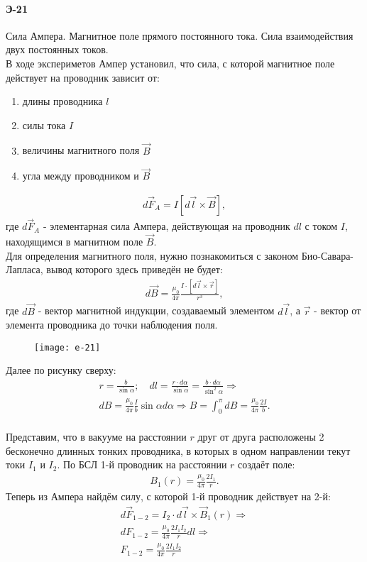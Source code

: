 \documentclass[__main__.tex]{subfiles}
\begin{document}
\paragraph{Э-21}
Сила Ампера. Магнитное поле прямого постоянного тока. Сила взаимодействия двух постоянных токов.\\

В ходе экспериметов Ампер установил, что сила, с которой магнитное поле действует на проводник зависит от: 
\begin{enumerate}
	\item длины проводника $l$
	\item силы тока $I$
	\item величины магнитного поля $\vec B$
	\item угла между проводником и $\vec B$
\end{enumerate}
\begin{gather*}
	d\vec F_A = I \left[ d\vec l\times\vec B\right],
\end{gather*}
где $d\vec F_A$ - элементарная сила Ампера, действующая на проводник $dl$ с током $I$, находящимся в магнитном поле $\vec B$.
\\
Для определения магнитного поля, нужно познакомиться с законом Био-Савара-Лапласа, вывод которого здесь приведён не будет:
\begin{gather*}
	d\vec B = \frac{\mu_0}{4\pi}\frac{I\cdot\left[d\vec l\times\vec r\right]}{r^3},
\end{gather*}
где $d\vec B$ - вектор магнитной индукции, создаваемый элементом $d\vec l$, а $\vec r$ - вектор от элемента проводника до точки наблюдения поля.
\begin{figure}[h]
	\centering
	\texttt{[image: e-21]}
\end{figure}
Далее по рисунку сверху:
\begin{gather*}
	r = \frac{b}{\sin\alpha};\quad
	dl = \frac{r\cdot d\alpha}{\sin\alpha} = \frac{b\cdot d\alpha}{\sin^2\alpha}\Rightarrow\\
	dB = \frac{\mu_0}{4\pi}\frac{I}{b}\sin\alpha d\alpha\Rightarrow B = \int_{0}^{\pi}dB = \frac{\mu_0}{4\pi}\frac{2I}{b}.
\end{gather*}
\\
Представим, что в вакууме на расстоянии $r$ друг от друга расположены 2 бесконечно длинных тонких проводника, в которых в одном направлении текут токи $I_1$ и $I_2$. По БСЛ 1-й проводник на расстоянии $r$  создаёт поле:
\begin{gather*}
	B_1(r) = \frac{\mu_0}{4\pi}\frac{2I_1}{r}.
\end{gather*}
Теперь из Ампера найдём силу, с которой 1-й проводник действует на 2-й:
\begin{gather*}
	d\vec F_{1-2} = I_2\cdot d\vec l\times\vec B_1(r)\Longrightarrow\\
	dF_{1-2} = \frac{\mu_0}{4\pi}\frac{2I_1I_2}{r}dl\Longrightarrow\\
	F_{1-2} = \frac{\mu_0}{4\pi}\frac{2I_1I_2}{r}
\end{gather*}
\end{document}
